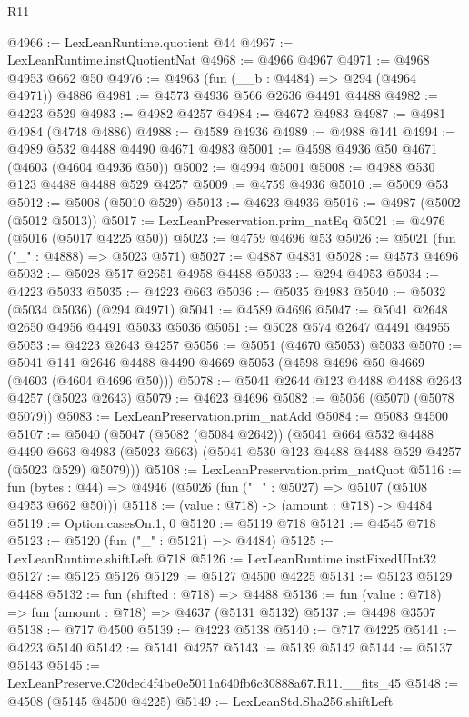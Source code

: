 \begin{lexlean}{R11}
\begin{coremodule}
@4966 := LexLeanRuntime.quotient @44
@4967 := LexLeanRuntime.instQuotientNat
@4968 := @4966 @4967
@4971 := @4968 @4953 @662 @50
@4976 := @4963 (fun (__b : @4484) => @294 (@4964 @4971)) @4886
@4981 := @4573 @4936 @566 @2636 @4491 @4488
@4982 := @4223 @529
@4983 := @4982 @4257
@4984 := @4672 @4983
@4987 := @4981 @4984 (@4748 @4886)
@4988 := @4589 @4936
@4989 := @4988 @141
@4994 := @4989 @532 @4488 @4490 @4671 @4983
@5001 := @4598 @4936 @50 @4671 (@4603 (@4604 @4936 @50))
@5002 := @4994 @5001
@5008 := @4988 @530 @123 @4488 @4488 @529 @4257
@5009 := @4759 @4936
@5010 := @5009 @53
@5012 := @5008 (@5010 @529)
@5013 := @4623 @4936
@5016 := @4987 (@5002 (@5012 @5013))
@5017 := LexLeanPreservation.prim_natEq
@5021 := @4976 (@5016 (@5017 @4225 @50))
@5023 := @4759 @4696 @53
@5026 := @5021 (fun ("_" : @4888) => @5023 @571)
@5027 := @4887 @4831
@5028 := @4573 @4696
@5032 := @5028 @517 @2651 @4958 @4488
@5033 := @294 @4953
@5034 := @4223 @5033
@5035 := @4223 @663
@5036 := @5035 @4983
@5040 := @5032 (@5034 @5036) (@294 @4971)
@5041 := @4589 @4696
@5047 := @5041 @2648 @2650 @4956 @4491 @5033 @5036
@5051 := @5028 @574 @2647 @4491 @4955
@5053 := @4223 @2643 @4257
@5056 := @5051 (@4670 @5053) @5033
@5070 := @5041 @141 @2646 @4488 @4490 @4669 @5053 (@4598 @4696 @50 @4669 (@4603 (@4604 @4696 @50)))
@5078 := @5041 @2644 @123 @4488 @4488 @2643 @4257 (@5023 @2643)
@5079 := @4623 @4696
@5082 := @5056 (@5070 (@5078 @5079))
@5083 := LexLeanPreservation.prim_natAdd
@5084 := @5083 @4500
@5107 := @5040
    (@5047
      (@5082 (@5084 @2642))
      (@5041
        @664
        @532
        @4488
        @4490
        @663
        @4983
        (@5023 @663)
        (@5041 @530 @123 @4488 @4488 @529 @4257 (@5023 @529) @5079)))
@5108 := LexLeanPreservation.prim_natQuot
@5116 := fun (bytes : @44) => @4946 (@5026 (fun ("_" : @5027) => @5107 (@5108 @4953 @662 @50)))
@5118 := (value : @718) -> (amount : @718) -> @4484
@5119 := Option.casesOn.{1, 0}
@5120 := @5119 @718
@5121 := @4545 @718
@5123 := @5120 (fun ("_" : @5121) => @4484)
@5125 := LexLeanRuntime.shiftLeft @718
@5126 := LexLeanRuntime.instFixedUInt32
@5127 := @5125 @5126
@5129 := @5127 @4500 @4225
@5131 := @5123 @5129 @4488
@5132 := fun (shifted : @718) => @4488
@5136 := fun (value : @718) => fun (amount : @718) => @4637 (@5131 @5132)
@5137 := @4498 @3507
@5138 := @717 @4500
@5139 := @4223 @5138
@5140 := @717 @4225
@5141 := @4223 @5140
@5142 := @5141 @4257
@5143 := @5139 @5142
@5144 := @5137 @5143
@5145 := LexLeanPreserve.C20ded4f4be0e5011a640fb6c30888a67.R11.__fits_45
@5148 := @4508 (@5145 @4500 @4225)
@5149 := LexLeanStd.Sha256.shiftLeft

\end{coremodule}
\end{lexlean}
